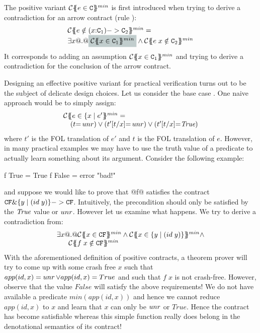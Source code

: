 The positive variant $\ctransmin{}{\Gamma}{e \in \Ct}$ is first introduced when 
trying to derive a contradiction for an arrow contract (rule ): 
\[\begin{array}{l}
   \ctransmin{\Sigma}{\Gamma}{e \notin (x{:}\Ct_1) -> \Ct_2}  = \\
    \exists x @.@ \highlight{\ctransmin{\Sigma}{\Gamma,x}{x \in \Ct_1}} \land \ctransmin{\Sigma}{\Gamma,x}{e\;x \notin \Ct_2}
\end{array}\]
It corresponds to adding an assumption $\ctransmin{\Sigma}{\Gamma,x}{x \in \Ct_1}$ and trying to 
derive a contradiction for the conclusion of the arrow contract. 

Designing an effective positive variant for practical verification turns out to be the subject of 
delicate design choices. Let us consider the base case . One naive approach would 
be to simply assign: 
\[\begin{array}{l}
     \ctransmin{}{\Gamma}{e \in \{ x \mid e' } = \\ 
     \quad (t{=}\unr) \lor (t'[t/x]{=}\unr) \lor (t'[t/x]{=}\True)
\end{array}\]
where $t'$ is the FOL translation of $e'$ and $t$ is the FOL translation of $e$. 
However, in many practical examples we may have to use the truth value of a predicate to actually learn something 
about its argument. Consider the following example:
\begin{code}
f True  = True
f False = error "bad!"
\end{code}
and suppose we would like to prove that @f@ satisfies the contract $\CF \& \{ y \mid (id\;y) \} -> \CF$. Intuitively, 
the precondition should only be satisfied by the $\True$ value or $\unr$. However let us examine what happens. We try
to derive a contradiction from:
\[\begin{array}{l}
    \exists x @.@ \ctransmin{}{\Gamma}{x \in \CF} \land \ctransmin{}{\Gamma}{x \in \{ y \mid (id\;y)\}} \land \\
    \phantom{\exists x \;\;} \ctransmin{}{\Gamma}{f\;x \notin \CF} 
\end{array}\] 
With the aforementioned definition of positive contracts, 
a theorem prover will try to come up with some crash free $x$ such that $app(id,x) = \unr \lor app(id,x) = True$
and such that $f\;x$ is not crash-free. However, observe that the value $False$ will satisfy the above requirements! 
We do not have available a predicate $min(app(id,x))$ and hence we cannot reduce $app(id,x)$ to $x$ and learn that $x$ 
can only be $\unr$ or $True$. Hence the contract has become satisfiable whereas this simple function really does belong
in the denotational semantics of its contract! 

